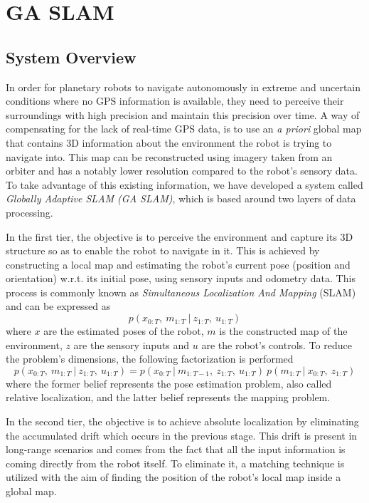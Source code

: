 \label{Chapter2}

\chapter{GA SLAM}

\section{System Overview} \label{system_overview}

In order for planetary robots to navigate autonomously in extreme and
uncertain conditions where no GPS information is available,
they need to perceive their surroundings with high precision and
maintain this precision over time.
A way of compensating for the lack of real-time GPS data, is to use
an \textit{a priori} global map that contains 3D information about the
environment the robot is trying to navigate into.
This map can be reconstructed using imagery taken from an orbiter and
has a notably lower resolution compared to the robot's sensory data.
To take advantage of this existing information, we have developed a system
called \textit{Globally Adaptive SLAM (GA SLAM)},
which is based around two layers of data processing.

In the first tier, the objective is to perceive the environment and
capture its 3D structure so as to enable the robot to navigate in it.
This is achieved by constructing a local map and estimating the robot's
current pose (position and orientation) w.r.t. its initial pose,
using sensory inputs and odometry data.
This process is commonly known as
\textit{Simultaneous Localization And Mapping} (SLAM) and can be expressed as
\begin{equation}
    p(x_{0:T} ,\ m_{1:T} \ | \ z_{1:T} ,\ u_{1:T})
\end{equation}
where
$x$ are the estimated poses of the robot,
$m$ is the constructed map of the environment,
$z$ are the sensory inputs and
$u$ are the robot's controls.
To reduce the problem's dimensions, the following factorization is performed
\begin{equation}
    p(x_{0:T} ,\ m_{1:T} \ | \ z_{1:T} ,\ u_{1:T}) =
    p(x_{0:T} \ | \ m_{1:T-1} ,\ z_{1:T} ,\ u_{1:T}) \
    p(m_{1:T} \ | \ x_{0:T} ,\ z_{1:T})
\end{equation}
where
the former belief represents the pose estimation problem, also called
relative localization, and the latter belief represents the mapping problem.

In the second tier, the objective is to achieve absolute localization by
eliminating the accumulated drift which occurs in the previous stage.
This drift is present in long-range scenarios and comes from the fact that
all the input information is coming directly from the robot itself.
To eliminate it, a matching technique is utilized with the aim of finding the
position of the robot's local map inside a global map.

